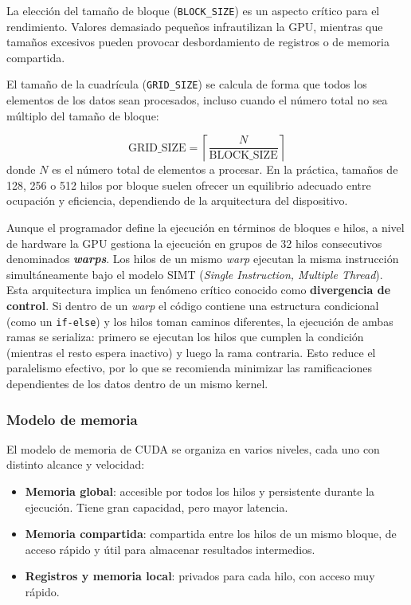 La elección del tamaño de bloque (\texttt{BLOCK\_SIZE}) es un aspecto crítico para el rendimiento.
Valores demasiado pequeños infrautilizan la GPU, mientras que tamaños excesivos pueden provocar desbordamiento de registros o de memoria compartida.

El tamaño de la cuadrícula (\texttt{GRID\_SIZE}) se calcula de forma que todos los elementos de los datos sean procesados, incluso cuando el número total no sea múltiplo del tamaño de bloque:

\[
    \text{GRID\_SIZE} = \left\lceil \frac{N}{\text{BLOCK\_SIZE}} \right\rceil
\]
donde \(N\) es el número total de elementos a procesar.
En la práctica, tamaños de 128, 256 o 512 hilos por bloque suelen ofrecer un equilibrio adecuado entre ocupación y eficiencia, dependiendo de la arquitectura del dispositivo.

Aunque el programador define la ejecución en términos de bloques e hilos, a nivel de hardware la GPU gestiona la ejecución en grupos de 32 hilos consecutivos denominados \textbf{\textit{warps}}.
Los hilos de un mismo \textit{warp} ejecutan la misma instrucción simultáneamente bajo el modelo SIMT (\textit{Single Instruction, Multiple Thread}).
Esta arquitectura implica un fenómeno crítico conocido como \textbf{divergencia de control}.
Si dentro de un \textit{warp} el código contiene una estructura condicional (como un \texttt{if-else}) y los hilos toman caminos diferentes, la ejecución de ambas ramas se serializa: primero se ejecutan los hilos que cumplen la condición (mientras el resto espera inactivo) y luego la rama contraria.
Esto reduce el paralelismo efectivo, por lo que se recomienda minimizar las ramificaciones dependientes de los datos dentro de un mismo kernel.

\subsubsection{Modelo de memoria}
El modelo de memoria de CUDA se organiza en varios niveles, cada uno con distinto alcance y velocidad:
\begin{itemize}
    \item \textbf{Memoria global}: accesible por todos los hilos y persistente durante la ejecución.
    Tiene gran capacidad, pero mayor latencia.
    \item \textbf{Memoria compartida}: compartida entre los hilos de un mismo bloque, de acceso rápido y útil para almacenar resultados intermedios.
    \item \textbf{Registros y memoria local}: privados para cada hilo, con acceso muy rápido.
\end{itemize}

